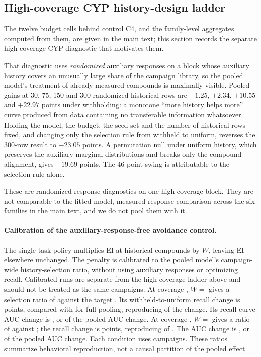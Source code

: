 \documentclass[10pt]{article}
\begin{document}
\subsection{High-coverage CYP history-design ladder}
\label{app:design-ladder}

The twelve budget cells behind control C4, and the family-level aggregates
computed from them, are given in the main text; this section records the
separate high-coverage CYP diagnostic that motivates them.

That diagnostic uses \emph{randomized} auxiliary responses on a block whose
auxiliary history covers an unusually large share of the campaign library, so
the pooled model's treatment of already-measured compounds is maximally
visible. Pooled gains at 30, 75, 150 and 300 randomized historical rows are
$-1.25$, $+2.34$, $+10.55$ and $+22.97$ points under withholding: a
monotone ``more history helps more'' curve produced from data containing no
transferable information whatsoever. Holding the model, the budget, the seed
set and the number of historical rows fixed, and changing only the selection
rule from withheld to uniform, reverses the 300-row result to $-23.05$
points. A permutation null under uniform history, which preserves the
auxiliary marginal distributions and breaks only the compound alignment,
gives $-19.69$ points. The $46$-point swing is attributable to the selection
rule alone.

These are randomized-response diagnostics on one high-coverage block. They
are not comparable to the fitted-model, measured-response comparison across
the six families in the main text, and we do not pool them with it.

\paragraph{Calibration of the auxiliary-response-free avoidance control.}
The single-task policy multiplies EI at historical compounds by $W$, leaving
EI elsewhere unchanged. The penalty is calibrated to the pooled model's
campaign-wide history-selection ratio, without using auxiliary responses
or optimizing recall. Calibrated runs are separate from the high-coverage
ladder above and should not be treated as the same campaigns.
At coverage \avoidCoverageHundred{}, $W=$\avoidWHundred{} gives a
selection ratio of \avoidAchievedRatioHundred{} against the target
\avoidTargetRatioHundred{}. Its withheld-to-uniform recall change is
\avoidRecallSwingHundred{} points, compared with
\pooledRecallSwingHundred{} for full pooling, reproducing
\avoidRecallFracHundred{} of the change. Its recall-curve AUC change is
\avoidAucSwingHundred{}, or \avoidAucFracHundred{} of the pooled AUC change.
At coverage \avoidCoverageFifty{}, $W=$\avoidWFifty{} gives a ratio of
\avoidAchievedRatioFifty{} against \avoidTargetRatioFifty{}; the recall
change is \avoidRecallSwingFifty{} points, reproducing
\avoidRecallFracFifty{} of \pooledRecallSwingFifty{}. The AUC change is
\avoidAucSwingFifty{}, or \avoidAucFracFifty{} of the pooled AUC change.
Each condition uses \avoidCampaignsHundred{} campaigns. These ratios
summarize behavioral reproduction, not a causal partition of the pooled effect.
\end{document}
